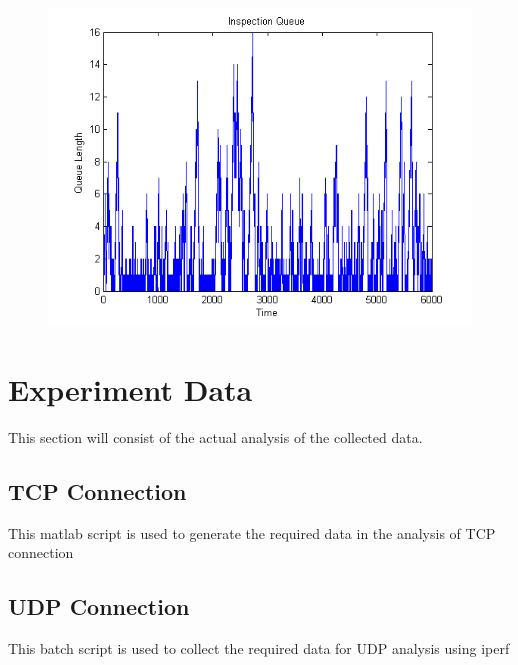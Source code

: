 \documentclass[aps,letterpaper,10pt]{revtex4}
\begin{document}
\begin{itemize}
\begin{figure}[htp]
\begin{center}
{                            \includegraphics[scale=0.5]{../analysis/5/Images/inspection_queue.png}
                        }
                        \end{center}
                    \end{figure}
            \end{itemize}



\newpage
\section{Experiment Data}
This section will consist of the actual analysis of the collected data.  \vspace{5mm}
    \subsection{TCP Connection}
    This matlab script is used to generate the required data in the analysis of TCP connection    
    	
    	\vspace{3mm}
        \newpage
    \subsection{UDP Connection}
    This batch script is used to collect the required data for UDP analysis using iperf
        
    	\vspace{3mm}

                
                

\end{document}
